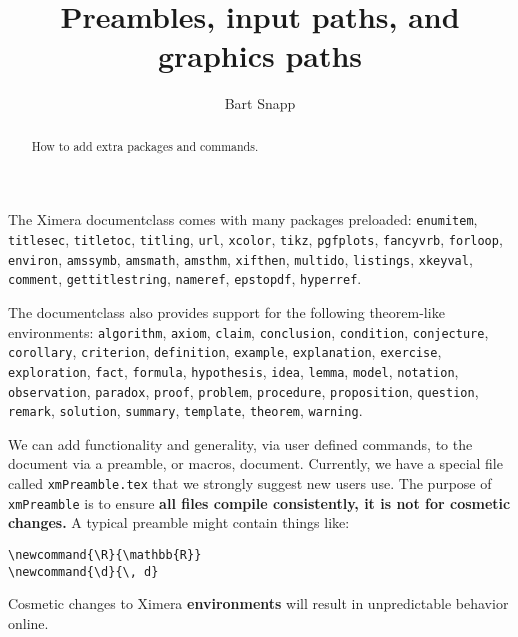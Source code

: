 \documentclass{ximera}
\title{Preambles, input paths, and graphics paths}
\author{Bart Snapp}
\begin{document}
\begin{abstract}
  How to add extra packages and commands.
\end{abstract}
\maketitle

The Ximera documentclass comes with many packages preloaded:
\verb!enumitem!,
\verb!titlesec!,
\verb!titletoc!,
\verb!titling!,
\verb!url!,
\verb!xcolor!,
\verb!tikz!,
\verb!pgfplots!,
\verb!fancyvrb!,
\verb!forloop!,
\verb!environ!,
\verb!amssymb!,
\verb!amsmath!,
\verb!amsthm!,
\verb!xifthen!,
\verb!multido!,
\verb!listings!,
\verb!xkeyval!,
\verb!comment!,
\verb!gettitlestring!,
\verb!nameref!,
\verb!epstopdf!,
\verb!hyperref!.

The documentclass also provides support for the following theorem-like
environments:
\verb!algorithm!, \verb!axiom!, \verb!claim!, \verb!conclusion!,
\verb!condition!, \verb!conjecture!, \verb!corollary!, \verb!criterion!,
\verb!definition!, \verb!example!, \verb!explanation!, \verb!exercise!,
\verb!exploration!,
\verb!fact!, \verb!formula!, \verb!hypothesis!, \verb!idea!, \verb!lemma!,
\verb!model!,
\verb!notation!, \verb!observation!, \verb!paradox!, \verb!proof!,
\verb!problem!,
\verb!procedure!,
\verb!proposition!, \verb!question!, \verb!remark!, \verb!solution!,
\verb!summary!, \verb!template!, \verb!theorem!, \verb!warning!.

We can add functionality and generality, via user defined commands, to the
document via a preamble, or macros, document. Currently, we have a special file
called \verb!xmPreamble.tex! that we strongly suggest new users use.
The purpose of \verb!xmPreamble! is to ensure \textbf{all files compile
  consistently,
  it is not for cosmetic changes.} A typical preamble might contain things
like:

\begin{verbatim}
\newcommand{\R}{\mathbb{R}}
\newcommand{\d}{\, d}
\end{verbatim}

\begin{warning}
  Cosmetic changes to Ximera \textbf{environments} will result in unpredictable
  behavior
  online.
\end{warning}
\end{document}
